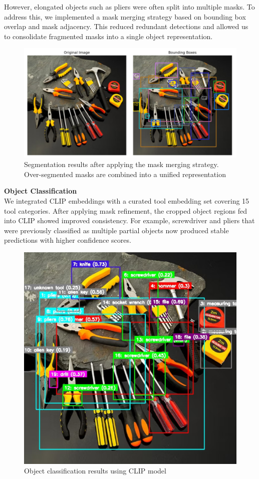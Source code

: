\documentclass[12pt]{extarticle}
\begin{document}
However, elongated objects such as pliers were often split into multiple masks. To address this, we implemented a mask merging strategy based on bounding box overlap and mask adjacency. This reduced redundant detections and allowed us to consolidate fragmented masks into a single object representation.

\begin{figure}[htbp]
    \centering
    \includegraphics[width=\linewidth]{images/sam_post.png}
    \caption{Segmentation results after applying the mask merging strategy. 
    Over-segmented masks are combined into a unified representation}
    \label{fig: sam_post}
\end{figure}

\textbf{Object Classification} \\
We integrated CLIP embeddings with a curated tool embedding set covering 15 tool categories. After applying mask refinement, the cropped object regions fed into CLIP showed improved consistency. For example, screwdriver and pliers that were previously classified as multiple partial objects now produced stable predictions with higher confidence scores.

\begin{figure}[htbp]
    \centering
    \includegraphics[width=0.5\linewidth]{images/clips_img.png}
    \caption{Object classification results using CLIP model}
    \label{fig: clips_img}
\end{figure}
\end{document}
